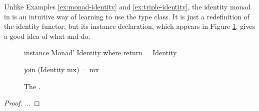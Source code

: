 
\begin{example}
  \label{ex:monad-identity-haskell}

  Unlike Examples \ref{ex:monad-identity} and
  \ref{ex:triple-identity}, the identity monad in \hask is an
  intuitive way of learning to use the  type
  class. It is just a redefinition of the identity functor, but its
  instance declaration, which appears in Figure
  \ref{fig:monad-identity-haskell}, gives a good idea of what
   and  do.

  \begin{figure}[htbp]
    \begin{codehaskell}
instance Monad' Identity where
  return = Identity

  join (Identity mx) = mx
    \end{codehaskell}
    \caption{The  .}
    \label{fig:monad-identity-haskell}
  \end{figure}

  \begin{proof}
    ...
  \end{proof}
\end{example}

